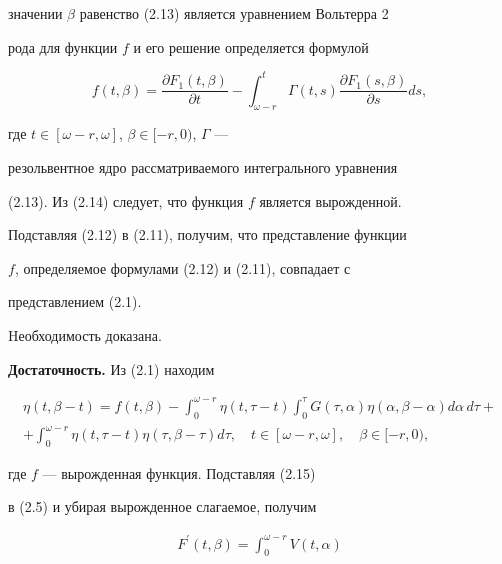 \begin{pf}
значении $\beta$ равенство (2.13) является уравнением Вольтерра 2


рода для функции $f$ и его решение определяется формулой


\begin{equation}


f(t,\beta) = \frac{\partial F_{1}(t, \beta)}{\partial t} -


\int_{\omega-r}^{t} \Gamma(t,s) \frac{\partial F_{1}(s, \beta) }


{\partial s} ds,


\end{equation}


где $t \in[\omega-r, \omega]$, $\beta \in[-r,0)$, $\Gamma$ ---


резольвентное ядро рассматриваемого интегрального уравнения


(2.13). Из (2.14) следует, что функция $f$ является вырожденной.


Подставляя (2.12) в (2.11), получим, что представление функции


$f$, определяемое формулами (2.12) и (2.11), совпадает с


представлением (2.1).


Hеобходимость доказана.


\medskip





{\bf Достаточность.} Из (2.1) находим


\begin{multline}


\eta(t, \beta-t) =f(t,


\beta) - \int_{0}^{\omega-r} \eta(t, \tau-t)


\int_{0}^{\tau}G(\tau, \alpha) \eta(\alpha, \beta- \alpha)d\alpha\,d\tau+\\


%


+ \int_{0}^{\omega-r} \eta(t, \tau-t) \eta(\tau, \beta- \tau) d \tau,


\quad t \in[\omega-r, \omega], \quad \beta \in[-r,0),


\end{multline}


где $f$ --- вырожденная функция. Подставляя (2.15)


в (2.5) и убирая вырожденное слагаемое, получим


\begin{multline}


F^{\prime}(t,\beta) = \int_{0}^{\omega-r}V(t, \alpha)



\end{multline}
\end{pf}

